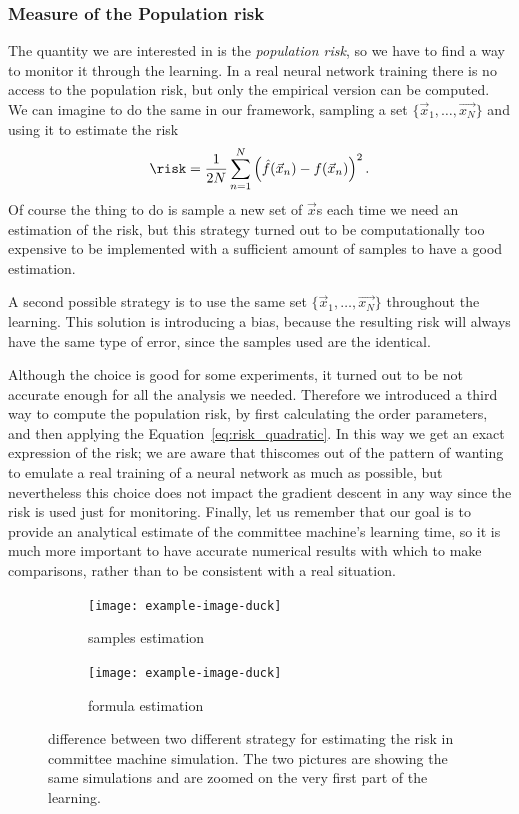\subsubsection{Measure of the Population risk}
The quantity we are interested in is the \emph{population risk}, so we have to find
a way to monitor it through the learning. In a real neural network training there is 
no access to the population risk, but only the empirical version can be computed.
We can imagine to do the same in our framework, sampling a set \(\{\vec{x}_1,\dots,\vec{x_N}\}\) 
and using it to estimate the risk
\[\risk = \frac{1}{2N}\sum_{n=1}^N\left(\hat{f}(\vec{x}_n)-f(\vec{x}_n)\right)^2.\]
Of course the thing to do is sample a new set of \(\vec{x}\)s each time we need an estimation
of the risk, but this strategy turned out to be computationally too expensive to be
implemented with a sufficient amount of samples to have a good estimation.

A second possible strategy is to use the same set \(\{\vec{x}_1,\dots,\vec{x_N}\}\) 
throughout the learning. This solution is introducing a bias, because the resulting risk
will always have the same type of error, since the samples used are the identical.

Although the choice is good for some experiments, it turned out to be not accurate enough
for all the analysis we needed. Therefore we introduced a third way to compute the population 
risk, by first calculating the order parameters, and then applying the Equation~\eqref{eq:risk_quadratic}.
In this way we get an exact expression of the risk;
we are aware that thiscomes out of the pattern of wanting to emulate a real training of a neural network as much as possible,
but nevertheless this choice does not impact the gradient descent in any way since
the risk is used just for monitoring.
Finally, let us remember that our goal is to provide an analytical estimate of the committee machine's learning time,
so it is much more important to have accurate numerical results with which to make comparisons,
rather than to be consistent with a real situation.
\begin{figure}
  \centering
  \begin{subfigure}{0.45\textwidth}
    \texttt{[image: example-image-duck]}
    \caption{samples estimation}
  \end{subfigure}
  \begin{subfigure}{0.45\textwidth}
    \texttt{[image: example-image-duck]}
    \caption{formula estimation}
  \end{subfigure}

  \caption{
    difference between two different strategy for estimating the risk in committee machine simulation.
    The two pictures are showing the same simulations and are zoomed on the very first part of the learning.
  }
  \label{fig:sampling_formula_risk}
\end{figure}

